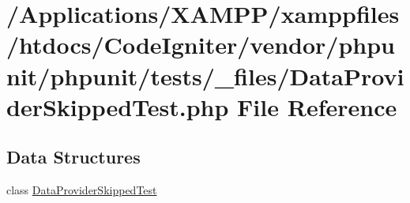 \hypertarget{_data_provider_skipped_test_8php}{}\section{/\+Applications/\+X\+A\+M\+P\+P/xamppfiles/htdocs/\+Code\+Igniter/vendor/phpunit/phpunit/tests/\+\_\+files/\+Data\+Provider\+Skipped\+Test.php File Reference}
\label{_data_provider_skipped_test_8php}
\subsection*{Data Structures}
\begin{DoxyCompactItemize}
\item 
class \mbox{\hyperlink{class_data_provider_skipped_test}{Data\+Provider\+Skipped\+Test}}
\end{DoxyCompactItemize}
